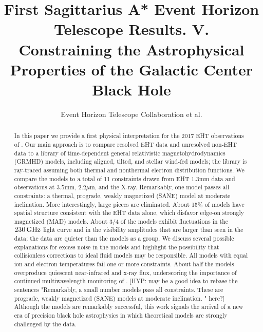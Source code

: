 \documentclass[twocolumn,twocolappendix,tighten,dvipsnames,linenumbers]{aastex63}
\newcommand\note[1]{{\color{OliveGreen}[note: #1]}}
\newcommand\hyp[1]{{\color{Salmon}[HYP: #1]}}
\begin{document}
\title{First Sagittarius A* Event Horizon Telescope Results. V.\\
  Constraining the Astrophysical Properties of the Galactic Center Black Hole}

%
\author{Event Horizon Telescope Collaboration et al.}


\received{\today}
\revised{\today}

\begin{abstract}

In this paper we provide a first physical interpretation for the 2017
EHT observations of \sgra.
Our main approach is to compare resolved EHT data and unresolved
non-EHT data to a library of time-dependent general relativistic
magnetohydrodynamics (GRMHD) models, including aligned, tilted, and
stellar wind-fed models; the library is ray-traced assuming both
thermal and nonthermal electron distribution functions.  We compare
the models to a total of 11 constraints drawn from EHT $1.3$mm data and  observations at $3.5$mm, $2.2\mu$m, and the X-ray.  Remarkably, one model passes all constraints: a thermal, prograde, weakly magnetized (SANE) model at moderate inclination.  More interestingly, large pieces are eliminated.
About 15\% of models have spatial structure consistent with the EHT data alone, which disfavor edge-on strongly magnetized (MAD) models. 
About 3/4 of the models exhibit fluctuations in the $230\,\mathrm{GHz}$
light curve and in the visibility amplitudes that are larger than seen in the data; the data are quieter than the models as a group.
We discuss several possible explanations for excess noise
in the models and highlight the possibility that collisionless
corrections to ideal fluid models may be responsible.
All models with equal ion and electron temperatures fail one or more
constraints.
About half the models overproduce quiescent near-infrared and x-ray
flux, underscoring the importance of continued multiwavelength
monitoring of \sgra.
\hyp{may be a good idea to rebase the sentences "Remarkably, a small number models pass all constraints.  These are prograde, weakly magnetized (SANE) models at moderate inclination.  " here?}
Although the models are remarkably successful, this work
signals the arrival of a new era of precision black hole astrophysics
in which theoretical models are strongly challenged by the data.

\end{abstract}
\end{document}
